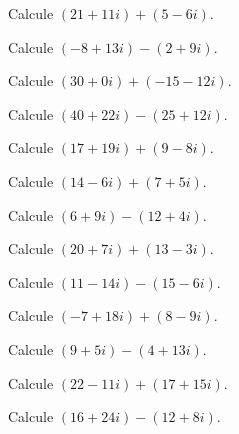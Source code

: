 \begin{ejercicio}
Calcule $(21+11i) + (5-6i)$.
\end{ejercicio}

\begin{ejercicio}
Calcule $(-8+13i) - (2+9i)$.
\end{ejercicio}

\begin{ejercicio}
Calcule $(30+0i) + (-15-12i)$.
\end{ejercicio}

\begin{ejercicio}
Calcule $(40+22i) - (25+12i)$.
\end{ejercicio}

\begin{ejercicio}
Calcule $(17+19i) + (9-8i)$.
\end{ejercicio}

\begin{ejercicio}
Calcule $(14-6i) + (7+5i)$.
\end{ejercicio}

\begin{ejercicio}
Calcule $(6+9i) - (12+4i)$.
\end{ejercicio}

\begin{ejercicio}
Calcule $(20+7i) + (13-3i)$.
\end{ejercicio}

\begin{ejercicio}
Calcule $(11-14i) - (15-6i)$.
\end{ejercicio}

\begin{ejercicio}
Calcule $(-7+18i) + (8-9i)$.
\end{ejercicio}

\begin{ejercicio}
Calcule $(9+5i) - (4+13i)$.
\end{ejercicio}

\begin{ejercicio}
Calcule $(22-11i) + (17+15i)$.
\end{ejercicio}

\begin{ejercicio}
Calcule $(16+24i) - (12+8i)$.
\end{ejercicio}
